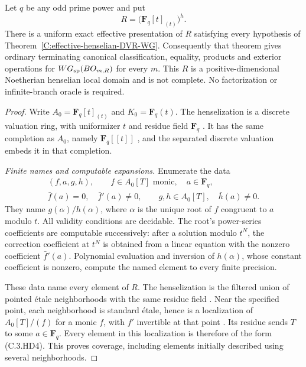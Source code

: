 \begin{theorem}
\label{C:function-DVR-henselization-effective}
Let $q$ be any odd prime power and put
\[
              R=\bigl(\mathbf F_q[t]_{(t)}\bigr)^h.
\]
There is a uniform exact effective presentation of $R$
satisfying every hypothesis of
Theorem~\ref{C:effective-henselian-DVR-WG}.
Consequently that theorem gives ordinary terminating
canonical classification, equality, products and
exterior operations for $WG_{\rm sp}(BO_{m,R})$ for
every $m$.  This $R$ is a positive-dimensional
Noetherian henselian local domain and is not complete.
No factorization or infinite-branch oracle is required.
\end{theorem}
\begin{proof}
Write $A_0=\mathbf F_q[t]_{(t)}$ and $K_0=\mathbf F_q(t)$.
The henselization is a discrete valuation ring, with
uniformizer $t$ and residue field $\mathbf F_q$
\cite[Tag 0AP3, Lemma 15.46.11]{C-StacksHenselianEffective}.
It has the same completion as $A_0$, namely
$\mathbf F_q[[t]]$
\cite[Tag 06LJ, Lemma 15.46.3]{C-StacksHenselianEffective},
and the separated discrete valuation embeds it in
that completion.

\emph{Finite names and computable expansions.}
Enumerate the data
\[
 \begin{gathered}
 (f,a,g,h),\qquad f\in A_0[T]\text{ monic},\quad
 a\in\mathbf F_q,\\
 \bar f(a)=0,\quad\bar f'(a)\ne0,\qquad
 g,h\in A_0[T],\quad\bar h(a)\ne0.
 \end{gathered}                                        \tag{C.3.HD4}
\]
They name $g(\alpha)/h(\alpha)$, where $\alpha$ is the
unique root of $f$ congruent to $a$ modulo $t$.
All validity conditions are decidable.  The root's
power-series coefficients are computable successively:
after a solution modulo $t^N$, the correction coefficient
at $t^N$ is obtained from a linear equation with the
nonzero coefficient $\bar f'(a)$.
Polynomial evaluation and inversion of $h(\alpha)$,
whose constant coefficient is nonzero, compute the
named element to every finite precision.

These data name every element of $R$.
The henselization is the filtered union of pointed
\'{e}tale neighborhoods with the same residue field
\cite[Tag 0BSK, Lemma 10.155.1 and its construction]
 {C-StacksHenselianEffective}.
Near the specified point, each neighborhood is standard
\'{e}tale, hence is a localization of $A_0[T]/(f)$
for a monic $f$, with $f'$ invertible at that point
\cite[Tag 00UE, Proposition 10.144.4]{C-StacksHenselianEffective}.
Its residue sends $T$ to some $a\in\mathbf F_q$.
Every element in this localization is therefore of
the form (C.3.HD4).  This proves coverage, including
elements initially described using several neighborhoods.


\end{proof}
